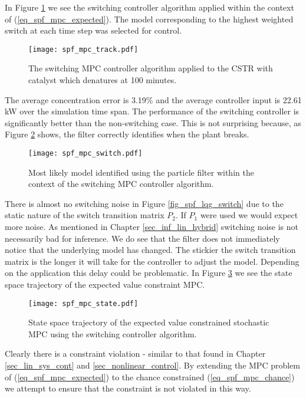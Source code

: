In Figure \ref{fig_spf_mpc_track} we see the switching controller algorithm applied within the context of (\ref{eq_spf_mpc_expected}). The model corresponding to the highest weighted switch at each time step was selected for control.
\begin{figure}[H] 
\centering
\texttt{[image: spf\_mpc\_track.pdf]}
\caption{The switching MPC controller algorithm applied to the CSTR with catalyst which denatures at 100 minutes.}
\label{fig_spf_mpc_track}
\end{figure}
The average concentration error is 3.19\% and the average controller input is 22.61 kW over the simulation time span. The performance of the switching controller is significantly better than the non-switching case. This is not surprising because, as Figure \ref{fig_spf_mpc_switch} shows, the filter correctly identifies when the plant breaks.
\begin{figure}[H] 
\centering
\texttt{[image: spf\_mpc\_switch.pdf]}
\caption{Most likely model identified using the particle filter within the context of the switching MPC controller algorithm.}
\label{fig_spf_mpc_switch}
\end{figure}
There is almost no switching noise in Figure \ref{fig_spf_lqg_switch} due to the static nature of the switch transition matrix $P_2$. If $P_1$ were used we would expect more noise. As mentioned in Chapter \ref{sec_inf_lin_hybrid} switching noise is not necessarily bad for inference. We do see that the filter does not immediately notice that the underlying model has changed. The stickier the switch transition matrix is the longer it will take for the controller to adjust the model. Depending on the application this delay could be problematic. In Figure \ref{fig_spf_mpc_state} we see the state space trajectory of the expected value constraint MPC.
\begin{figure}[H] 
\centering
\texttt{[image: spf\_mpc\_state.pdf]}
\caption{State space trajectory of the expected value constrained stochastic MPC using the switching controller algorithm.}
\label{fig_spf_mpc_state}
\end{figure}
Clearly there is a constraint violation - similar to that found in Chapter \ref{sec_lin_sys_cont} and \ref{sec_nonlinear_control}. By extending the MPC problem of (\ref{eq_spf_mpc_expected}) to the chance constrained (\ref{eq_spf_mpc_chance}) we attempt to ensure that the constraint is not violated in this way. 
